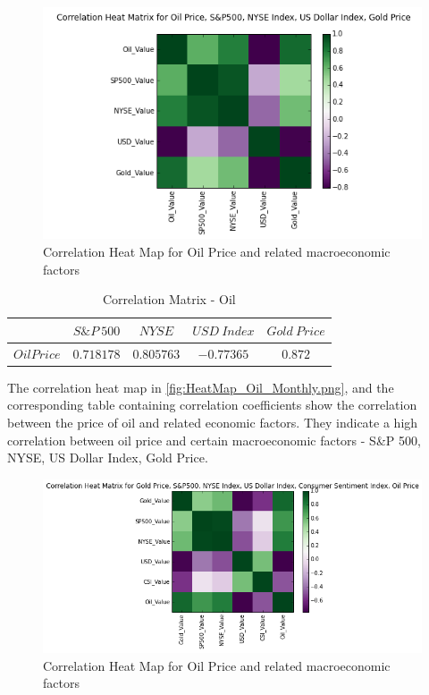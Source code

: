 \documentclass[runningheads]{llncs}
\begin{document}
\begin{figure}
\centering
\includegraphics[width=\textwidth]{HeatMap_Oil_Monthly.png}
\caption{Correlation Heat Map for Oil Price and related macroeconomic factors}
\label{fig:HeatMap_Oil_Monthly.png}
\end{figure}

\begin{table}
\begin{center}
\begin{tabular}{|c|c|c|c|c|}
\hline
$ $ & $ S\&P\ 500 $ & $ NYSE $ & $ USD\ Index $ & $Gold\ Price$ \\ \hline
$Oil Price$ & $0.718178$ & $0.805763$ & $-0.77365$ & $0.872$ \\ \hline
\end{tabular}
\end{center}
\caption{Correlation Matrix - Oil}
\end{table}


The correlation heat map in \autoref{fig:HeatMap_Oil_Monthly.png}, and the corresponding table containing correlation coefficients show the correlation between the price of oil and related economic factors. They indicate a high correlation between oil price and certain macroeconomic factors - S\&P 500, NYSE, US Dollar Index, Gold Price.

\begin{figure}
\centering
\includegraphics[width=\textwidth]{HeatMap_Gold_Monthly.png}
\caption{Correlation Heat Map for Oil Price and related macroeconomic factors}
\label{fig:HeatMap_Gold_Daily.png}
\end{figure}
\end{document}
